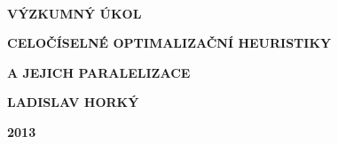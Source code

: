 \documentclass[oneside,12pt,a4paper]{report}
\theoremstyle{plain}
\begin{document}
\thispagestyle{empty}
~ 
\vspace{17.5cm}

\begin{center}
  {\large \textsf{\textbf{VÝZKUMNÝ ÚKOL}}}
  
  \vspace{5mm}
  {\Large \textsf{\textbf{CELOČÍSELNÉ OPTIMALIZAČNÍ HEURISTIKY}}}
  
    {\Large \textsf{\textbf{A JEJICH PARALELIZACE}}} 
  
  \vspace{5mm}
  {\large \textsf{\textbf{LADISLAV HORKÝ}}}
  
  \vspace{3mm}
  {\large \textsf{\textbf{2013}}}
\end{center}
\end{document}
